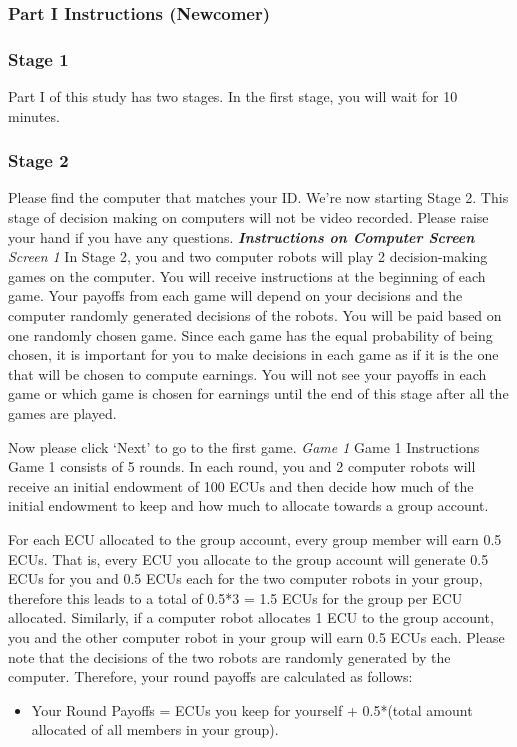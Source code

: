 \subsubsection{Part I Instructions (Newcomer)}
\subsubsection{\textbf{Stage 1}}
\newline
Part I of this study has two stages. In the first stage, you will wait for 10 minutes.
\subsubsection{\textbf{Stage 2}}
Please find the computer that matches your ID. We’re now starting Stage 2. This stage of decision making on computers will not be video recorded. Please raise your hand if you have any questions. 
\newline
\textbf{\textit{Instructions on Computer Screen}}
\newline
\textit{Screen 1}
\newline
In Stage 2, you and two computer robots will play 2 decision-making games on the computer. You will receive instructions at the beginning of each game. Your payoffs from each game will depend on your decisions and the computer randomly generated decisions of the robots. You will be paid based on one randomly chosen game. Since each game has the equal probability of being chosen, it is important for you to make decisions in each game as if it is the one that will be chosen to compute earnings. You will not see your payoffs in each game or which game is chosen for earnings until the end of this stage after all the games are played.

Now please click ‘Next’ to go to the first game.
\newline
\textit{Game 1}
\newline
Game 1 Instructions
\newline
Game 1 consists of 5 rounds. In each round, you and 2 computer robots will receive an initial endowment of 100 ECUs and then decide how much of the initial endowment to keep and how much to allocate towards a group account.

For each ECU allocated to the group account, every group member will earn 0.5 ECUs. That is, every ECU you allocate to the group account will generate 0.5 ECUs for you and 0.5 ECUs each for the two computer robots in your group, therefore this leads to a total of 0.5*3 = 1.5 ECUs for the group per ECU allocated. Similarly, if a computer robot allocates 1 ECU to the group account, you and the other computer robot in your group will earn 0.5 ECUs each. Please note that the decisions of the two robots are randomly generated by the computer. Therefore, your round payoffs are calculated as follows:
\begin{itemize}
    \item Your Round Payoffs = ECUs you keep for yourself + 0.5*(total amount allocated of all members in your group).
\end{itemize}

